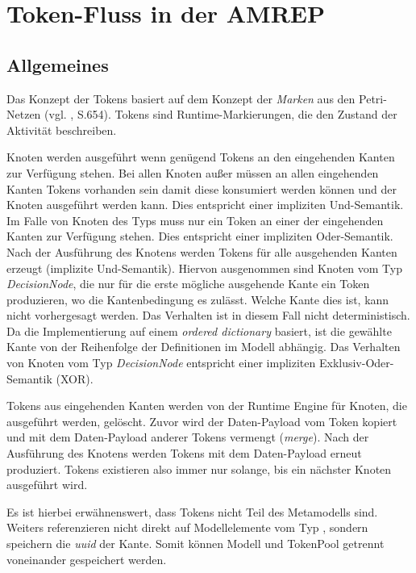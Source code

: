 \section{Token-Fluss in der AMREP}\label{amrep-token}

\subsection{Allgemeines}\label{token-allgemeines}
Das Konzept der Tokens basiert auf dem Konzept der \emph{Marken} aus den Petri-Netzen (vgl. \citep{RumbaughJacobsonBooch2005}, S.654). Tokens sind Runtime-Markierungen, die den Zustand der Aktivität beschreiben.

Knoten werden ausgeführt wenn genügend Tokens an den eingehenden Kanten zur Verfügung stehen. Bei allen Knoten außer  müssen an allen eingehenden Kanten Tokens vorhanden sein damit diese konsumiert werden können und der Knoten ausgeführt werden kann. Dies entspricht einer impliziten Und-Semantik. Im Falle von Knoten des Typs  muss nur ein Token an einer der eingehenden Kanten zur Verfügung stehen. Dies entspricht einer impliziten Oder-Semantik. Nach der Ausführung des Knotens werden Tokens für alle ausgehenden Kanten erzeugt (implizite Und-Semantik). Hiervon ausgenommen sind Knoten vom Typ \emph{DecisionNode}, die nur für die erste mögliche ausgehende Kante ein Token produzieren, wo die Kantenbedingung es zulässt. Welche Kante dies ist, kann nicht vorhergesagt werden. Das Verhalten ist in diesem Fall nicht deterministisch. Da die Implementierung auf einem \emph{ordered dictionary} basiert, ist die gewählte Kante von der Reihenfolge der Definitionen im Modell abhängig. Das Verhalten von Knoten vom Typ \emph{DecisionNode} entspricht einer impliziten Exklusiv-Oder-Semantik (XOR).

Tokens aus eingehenden Kanten werden von der Runtime Engine für Knoten, die ausgeführt werden, gelöscht. Zuvor wird der Daten-Payload vom Token kopiert und mit dem Daten-Payload anderer Tokens vermengt (\emph{merge}). Nach der Ausführung des Knotens werden Tokens mit dem Daten-Payload erneut produziert. Tokens existieren also immer nur solange, bis ein nächster Knoten ausgeführt wird.

Es ist hierbei erwähnenswert, dass Tokens nicht Teil des Metamodells sind. Weiters referenzieren nicht direkt auf Modellelemente vom Typ , sondern speichern die \emph{uuid} der Kante. Somit können Modell und TokenPool getrennt voneinander gespeichert werden.

